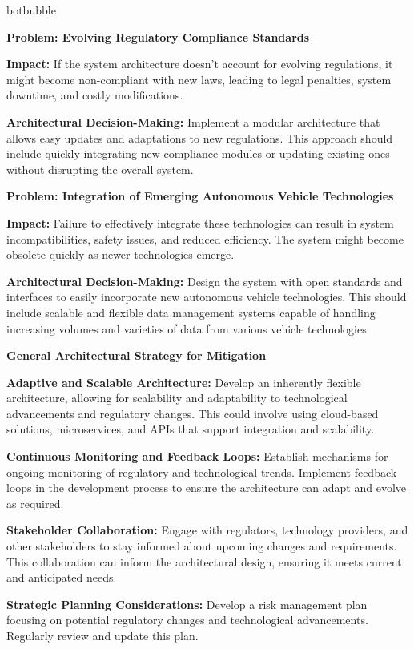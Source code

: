 \begin{chatout}{botbubble}{}

\noindent
\textbf{Problem: Evolving Regulatory Compliance Standards}

\noindent
\textbf{Impact: }If the system architecture doesn't account for evolving regulations, it might become non-compliant with new laws, leading to legal penalties, system downtime, and costly modifications.

\noindent
\textbf{Architectural Decision-Making:} Implement a modular architecture that allows easy updates and adaptations to new regulations. This approach should include quickly integrating new compliance modules or updating existing ones without disrupting the overall system.

\noindent
\textbf{Problem: Integration of Emerging Autonomous Vehicle Technologies}

\noindent
\textbf{Impact: }Failure to effectively integrate these technologies can result in system incompatibilities, safety issues, and reduced efficiency. The system might become obsolete quickly as newer technologies emerge.

\noindent
\textbf{Architectural Decision-Making:} Design the system with open standards and interfaces to easily incorporate new autonomous vehicle technologies. This should include scalable and flexible data management systems capable of handling increasing volumes and varieties of data from various vehicle technologies.

\noindent
\textbf{General Architectural Strategy for Mitigation}

\noindent
\textbf{Adaptive and Scalable Architecture:} Develop an inherently flexible architecture, allowing for scalability and adaptability to technological advancements and regulatory changes. This could involve using cloud-based solutions, microservices, and APIs that support integration and scalability.

\noindent        
\textbf{Continuous Monitoring and Feedback Loops:} Establish mechanisms for ongoing monitoring of regulatory and technological trends. Implement feedback loops in the development process to ensure the architecture can adapt and evolve as required.

\noindent
\textbf{Stakeholder Collaboration:} Engage with regulators, technology providers, and other stakeholders to stay informed about upcoming changes and requirements. This collaboration can inform the architectural design, ensuring it meets current and anticipated needs.

\noindent
\textbf{Strategic Planning Considerations:} Develop a risk management plan focusing on potential regulatory changes and technological advancements. Regularly review and update this plan.

\end{chatout}

